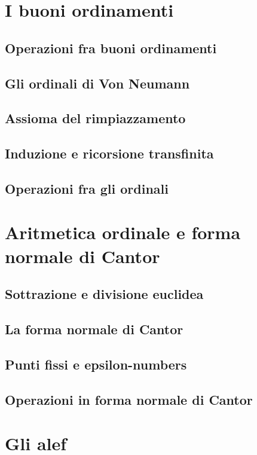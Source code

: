 \documentclass[11pt]{scrartcl}
\begin{document}
\newpage
\section{I buoni ordinamenti}
\subsection{Operazioni fra buoni ordinamenti}
\newpage
\subsection{Gli ordinali di Von Neumann}
\newpage
\subsection{Assioma del rimpiazzamento}
\newpage
\subsection{Induzione e ricorsione transfinita}
\newpage
\subsection{Operazioni fra gli ordinali}




\newpage
\section{Aritmetica ordinale e forma normale di Cantor}
\subsection{Sottrazione e divisione euclidea}
\newpage
\subsection{La forma normale di Cantor}
\newpage
\subsection{Punti fissi e epsilon-numbers}
\newpage
\subsection{Operazioni in forma normale di Cantor}
\newpage





\newpage
\section{Gli alef}
\end{document}
